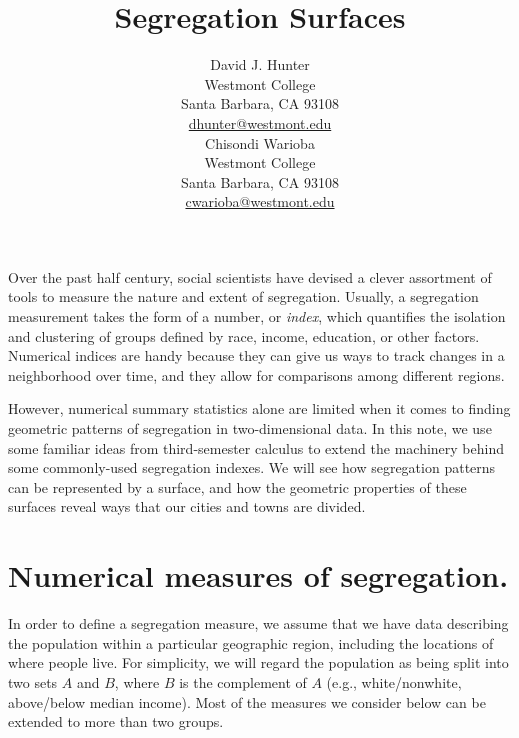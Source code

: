 \documentclass{article}
\theoremstyle{theorem}
\theoremstyle{definition}
\begin{document}
\title{Segregation Surfaces}

\author{
David J. Hunter \\
\scriptsize Westmont College \\
Santa Barbara, CA 93108 \\
\href{mailto:dhunter@westmont.edu}{dhunter@westmont.edu}\\[10pt]
\normalsize
Chisondi Warioba \\
\scriptsize Westmont College \\
Santa Barbara, CA 93108\\
\href{mailto:cwarioba@westmont.edu}{cwarioba@westmont.edu}
}

\maketitle

\noindent Over the past half century, social scientists have devised a clever assortment of tools to measure the nature and extent of segregation. \cite{harrisjohnson18} Usually, a segregation measurement takes the form of a number, or \textit{index}, which quantifies the isolation and clustering of groups defined by race, income, education, or other factors. Numerical indices are handy because they can give us ways to track changes in a neighborhood over time, and they allow for comparisons among different regions.

However, numerical summary statistics alone are limited when it comes to finding geometric patterns of segregation in two-dimensional data. In this note, we use some familiar ideas from third-semester calculus to extend the machinery behind some commonly-used segregation indexes. We will see how segregation patterns can be represented by a surface, and how the geometric properties of these surfaces reveal ways that our cities and towns are divided.

\section{Numerical measures of segregation.}

In order to define a segregation measure, we assume that we have data describing the population within a particular geographic region, including the locations of where people live. For simplicity, we will regard the population as being split into two sets $A$ and $B$, where $B$ is the complement of $A$ (e.g., white/nonwhite, above/below median income). Most of the measures we consider below can be extended to more than two groups.
\end{document}
